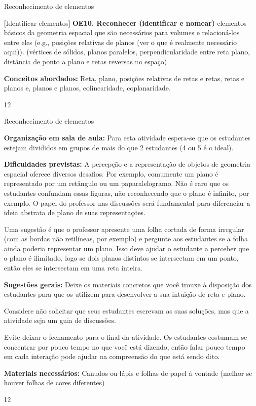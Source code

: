 \cleardoublepage
\def\currentcolor{session1}
\clearmargin
\begin{objectives}{Reconhecimento de elementos}
{
{[}Identificar elementos{]} \textbf{OE10. Reconhecer (identificar e nomear)} elementos básicos da geometria espacial que são necessários para volumes e relacioná-los entre eles (e.g., posições relativas de planos (ver o que é realmente necessário aqui)).  (vértices de sólidos, planos paralelos, perpendicularidade entre reta plano, distância de ponto a plano e retas reversas no espaço)

\textbf{Conceitos abordados:} Reta, plano, posições relativas de retas e retas, retas e planos e, planos e planos, colinearidade, coplanaridade.
}{1}{2}
\end{objectives}
\begin{sugestions}{Reconhecimento de elementos}
{
\textbf{Organização em sala de aula:} Para esta atividade espera-se que os estudantes estejam divididos em grupos de mais do que 2 estudantes (4 ou 5 é o ideal).

\textbf{Dificuldades previstas:} A percepção e a representação de objetos de geometria espacial oferece diversos desafios. Por exemplo, comumente um plano é representado por um retângulo ou um paparalelogramo. Não é raro que os estudantes confundam essas figuras, não reconhecendo que o plano é infinito, por exemplo. O papel do professor nas discussões será fundamental para diferenciar a ideia abstrata de plano de suas representações.

Uma sugestão é que o professor apresente uma folha cortada de forma irregular (com as bordas não retilíneas, por exemplo) e pergunte aos estudantes se a folha ainda poderia representar um plano. Isso deve ajudar o estudante a perceber que o plano é ilimitado, logo se dois planos distintos se intersectam em um ponto, então eles se intersectam em uma reta inteira.

\textbf{Sugestões gerais:} Deixe os materiais concretos que você trouxe à disposição dos estudantes para que os utilizem para desenvolver a sua intuição de reta e plano.

Considere não solicitar que seus estudantes escrevam as suas soluções, mas que a atividade seja um guia de discussões.

Evite deixar o fechamento para o final da atividade. Os estudantes costumam se concentrar por pouco tempo no que você está dizendo, então falar pouco tempo em cada interação pode ajudar na compreensão do que está sendo dito.

\textbf{Materiais necessários:} Canudos ou lápis e folhas de papel à vontade (melhor se houver folhas de cores diferentes)
}{1}{2}
\end{sugestions}
